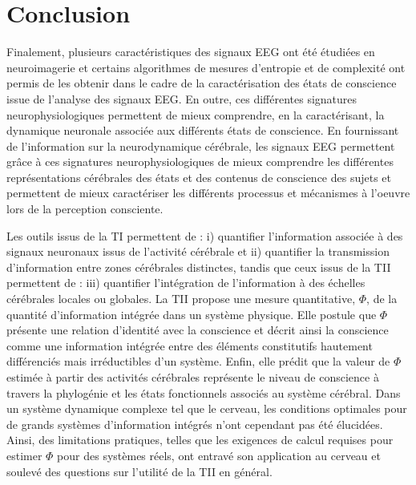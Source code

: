 \section{Conclusion}
\label{conclusionchapitre2}

Finalement, plusieurs caractéristiques des signaux EEG ont été étudiées en neuroimagerie et certains algorithmes de mesures d'entropie et de complexité ont permis de les obtenir dans le cadre de la caractérisation des états de conscience issue de l'analyse des signaux EEG. 
En outre, ces différentes signatures neurophysiologiques permettent de mieux comprendre, en la caractérisant, la dynamique neuronale associée aux différents états de conscience. 
En fournissant de l'information sur la neurodynamique cérébrale, les signaux EEG permettent grâce à ces signatures neurophysiologiques de mieux comprendre les différentes représentations cérébrales des états et des contenus de conscience des sujets et permettent de mieux caractériser les différents processus et mécanismes à l'oeuvre lors de la perception consciente. 

Les outils issus de la TI permettent de : i) quantifier l'information associée à des signaux neuronaux issus de l’activité cérébrale et ii) quantifier la transmission d'information entre zones cérébrales distinctes, tandis que ceux issus de la TII permettent de : iii) quantifier l'intégration de l'information à des échelles cérébrales locales ou globales. 
La TII propose une mesure quantitative, $\Phi$, de la quantité d'information intégrée dans un système physique. 
Elle postule que $\Phi$ présente une relation d'identité avec la conscience et décrit ainsi la conscience comme une information intégrée entre des éléments constitutifs hautement différenciés mais irréductibles d'un système. 
Enfin, elle prédit que la valeur de $\Phi$ estimée à partir des activités cérébrales représente le niveau de conscience à travers la phylogénie et les états fonctionnels associés au système cérébral. 
Dans un système dynamique complexe tel que le cerveau, les conditions optimales pour de grands systèmes d'information intégrés n'ont cependant pas été élucidées. 
Ainsi, des limitations pratiques, telles que les exigences de calcul requises pour estimer $\Phi$ pour des systèmes réels, ont entravé son application au cerveau et soulevé des questions sur l'utilité de la TII en général. 

